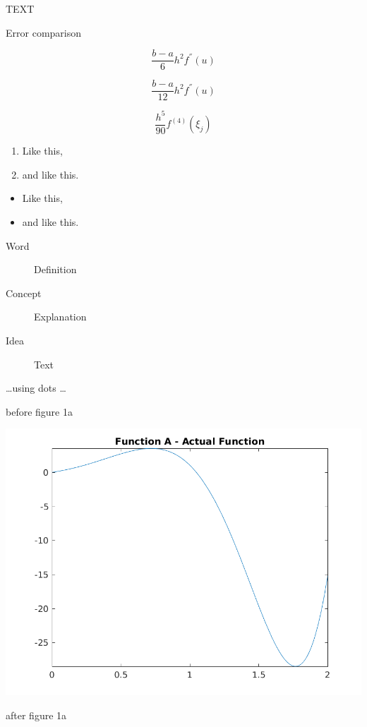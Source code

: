 \documentclass[a4paper]{article}
\begin{document}
TEXT

Error comparison

\begin{equation}
\frac{b-a}{6}h^2f^{''}(u)
\label{trap_err}
\end{equation}

\begin{equation}
\frac{b-a}{12}h^2f^{''}(u)
\label{mid_err}
\end{equation}

\begin{equation}
\frac{h^5}{90}f^{(4)}(\xi_j)
\label{sim_err}
\end{equation}
  


\begin{enumerate}
\item Like this,
\item and like this.
\end{enumerate}

\begin{itemize}
\item Like this,
\item and like this.
\end{itemize}

\begin{description}
\item[Word] Definition
\item[Concept] Explanation
\item[Idea] Text
\end{description}

\dots using dots \dots




before figure 1a
\begin{center}
	\includegraphics[width=1\textwidth]{../output/a_actual.png}
	\label{figa}
\end{center}
after figure 1a
\end{document}
